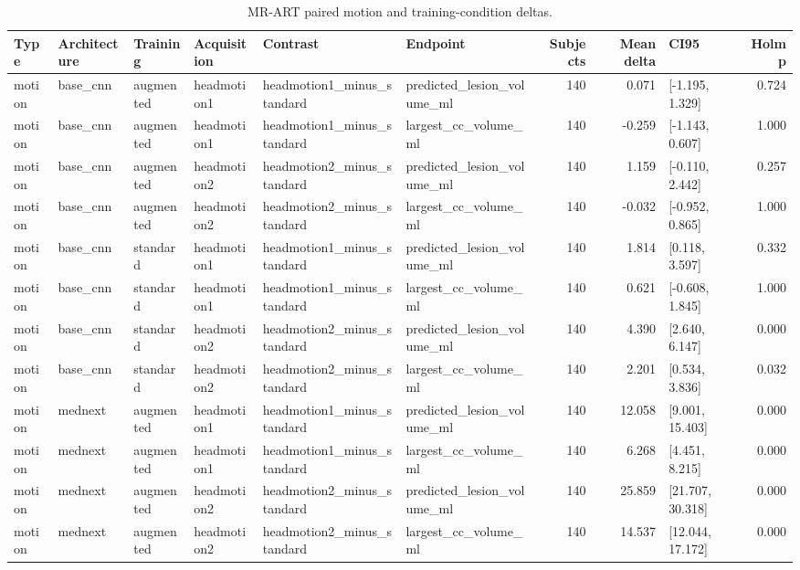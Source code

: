 \begin{table}
\caption{MR-ART paired motion and training-condition deltas.}
\label{tab:mrart_deltas}
\begin{tabular}{llllllrrlr}
\toprule
Type & Architecture & Training & Acquisition & Contrast & Endpoint & Subjects & Mean delta & CI95 & Holm p \\
\midrule
motion & base\_cnn & augmented & headmotion1 & headmotion1\_minus\_standard & predicted\_lesion\_volume\_ml & 140 & 0.071 & [-1.195, 1.329] & 0.724 \\
motion & base\_cnn & augmented & headmotion1 & headmotion1\_minus\_standard & largest\_cc\_volume\_ml & 140 & -0.259 & [-1.143, 0.607] & 1.000 \\
motion & base\_cnn & augmented & headmotion2 & headmotion2\_minus\_standard & predicted\_lesion\_volume\_ml & 140 & 1.159 & [-0.110, 2.442] & 0.257 \\
motion & base\_cnn & augmented & headmotion2 & headmotion2\_minus\_standard & largest\_cc\_volume\_ml & 140 & -0.032 & [-0.952, 0.865] & 1.000 \\
motion & base\_cnn & standard & headmotion1 & headmotion1\_minus\_standard & predicted\_lesion\_volume\_ml & 140 & 1.814 & [0.118, 3.597] & 0.332 \\
motion & base\_cnn & standard & headmotion1 & headmotion1\_minus\_standard & largest\_cc\_volume\_ml & 140 & 0.621 & [-0.608, 1.845] & 1.000 \\
motion & base\_cnn & standard & headmotion2 & headmotion2\_minus\_standard & predicted\_lesion\_volume\_ml & 140 & 4.390 & [2.640, 6.147] & 0.000 \\
motion & base\_cnn & standard & headmotion2 & headmotion2\_minus\_standard & largest\_cc\_volume\_ml & 140 & 2.201 & [0.534, 3.836] & 0.032 \\
motion & mednext & augmented & headmotion1 & headmotion1\_minus\_standard & predicted\_lesion\_volume\_ml & 140 & 12.058 & [9.001, 15.403] & 0.000 \\
motion & mednext & augmented & headmotion1 & headmotion1\_minus\_standard & largest\_cc\_volume\_ml & 140 & 6.268 & [4.451, 8.215] & 0.000 \\
motion & mednext & augmented & headmotion2 & headmotion2\_minus\_standard & predicted\_lesion\_volume\_ml & 140 & 25.859 & [21.707, 30.318] & 0.000 \\
motion & mednext & augmented & headmotion2 & headmotion2\_minus\_standard & largest\_cc\_volume\_ml & 140 & 14.537 & [12.044, 17.172] & 0.000 \\

\end{tabular}
\end{table}
